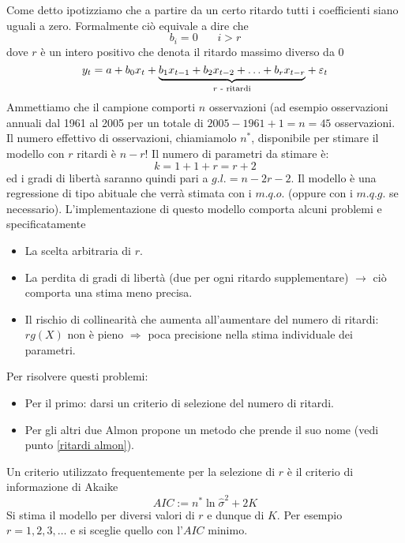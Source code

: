\documentclass[a4paper]{report}
\newcounter{ese}
\theoremstyle{remark}
\begin{document}
Come detto ipotizziamo che a partire da un certo ritardo tutti i
coefficienti siano uguali a zero. Formalmente ci\`{o} equivale a dire che%
\begin{equation*}
b_{i}=0\ \ \ \ \ \ \ \ i>r
\end{equation*}%
dove $r$ \`{e} un intero positivo che denota il ritardo massimo diverso da 0%
\begin{equation*}
y_{t}=a+b_{0}x_{t}+\underset{r\text{ - ritardi}}{\underbrace{%
b_{1}x_{t-1}+b_{2}x_{t-2}+\ldots +b_{r}x_{t-r}}}+\varepsilon _{t}
\end{equation*}%
Ammettiamo che il campione comporti $n$ osservazioni (ad esempio
osservazioni annuali dal 1961 al 2005 per un totale di $2005-1961+1=n=45$
osservazioni. Il numero effettivo di osservazioni, chiamiamolo $n^{\ast }$,
disponibile per stimare il modello con $r$ ritardi \`{e} $n-r$! Il numero di
parametri da stimare \`{e}:%
\begin{equation*}
k=1+1+r=r+2
\end{equation*}%
ed i gradi di libert\`{a} saranno quindi pari a $g.l.=n-2r-2$. Il modello 
\`{e} una regressione di tipo abituale che verr\`{a} stimata con i $m.q.o.$
(oppure con i $m.q.g.$ se necessario). L'implementazione di questo modello
comporta alcuni problemi e specificatamente

\begin{itemize}
\item La scelta arbitraria di $r$.

\item La perdita di gradi di libert\`{a} (due per ogni ritardo
supplementare) $\rightarrow $ ci\`{o} comporta una stima meno precisa.

\item Il rischio di collinearit\`{a} che aumenta all'aumentare del numero di
ritardi: $rg(X)$ non \`{e} pieno $\Rightarrow $ poca precisione nella stima
individuale dei parametri.
\end{itemize}

Per risolvere questi problemi:

\begin{itemize}
\item Per il primo: darsi un criterio di selezione del numero di ritardi.

\item Per gli altri due Almon propone un metodo che prende il suo nome (vedi
punto \ref{ritardi almon}).
\end{itemize}

Un criterio utilizzato frequentemente per la selezione di $r$ \`{e} il
criterio di informazione di Akaike%
\begin{equation*}
AIC:=n^{\ast }\ln \widehat{\sigma }^{2}+2K
\end{equation*}%
Si stima il modello per diversi valori di $r$ e dunque di $K$. Per esempio $%
r=1,2,3,\ldots $ e si sceglie quello con l'$AIC$ minimo.
\end{document}
